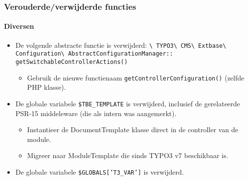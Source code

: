 \begin{frame}[fragile]
	\frametitle{Verouderde/verwijderde functies}
	\framesubtitle{Diversen}

	\begin{itemize}

		\item De volgende abstracte functie is verwijderd:\newline
			\smaller
				\texttt{\textbackslash
					TYPO3\textbackslash
					CMS\textbackslash
					Extbase\textbackslash
					Configuration\textbackslash
					AbstractConfigurationManager::}\newline
					\texttt{getSwitchableControllerActions()}
			\normalsize

			\begin{itemize}\smaller
				\item[\ding{228}] Gebruik de nieuwe functienaam \texttt{getControllerConfiguration()} (zelfde PHP klasse).
			\end{itemize}\normalsize

		\item De globale variabele \texttt{\$TBE\_TEMPLATE} is verwijderd, inclusief
			de gerelateerde PSR-15 middeleware (die als intern was aangemerkt).

			\begin{itemize}\smaller
				\item[\ding{228}] Instantieer de DocumentTemplate klasse direct in de controller van de module.
				\item[\ding{228}] Migreer naar ModuleTemplate die sinds TYPO3 v7 beschikbaar is.
			\end{itemize}\normalsize

		\item De globale variabele \texttt{\$GLOBALS['T3\_VAR']} is verwijderd.\newline

	\end{itemize}

\end{frame}

